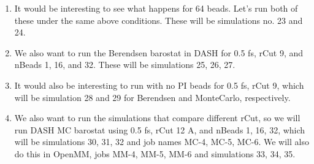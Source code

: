 \documentclass[12pt,reqno]{amsart}
\numberwithin{equation}{section}
\begin{document}
\begin{enumerate}
\item It would be interesting to see what happens for 64 beads.  Let's run both of these under the same above conditions.  These will be simulations no. 23 and 24.  
\item We also want to run the Berendsen barostat in DASH for 0.5 fs, rCut 9, and nBeads 1, 16, and 32.  These will be simulations 25, 26, 27.  
\item It would also be interesting to run with no PI beads for 0.5 fs, rCut 9, which will be simulation 28 and 29 for Berendsen and MonteCarlo, respectively.
\item We also want to run the simulations that compare different rCut, so we will run DASH MC barostat using 0.5 fs, rCut 12 A, and nBeads 1, 16, 32, which will be simulations 30, 31, 32 and job names MC-4, MC-5, MC-6.  We will also do this in OpenMM, jobs MM-4, MM-5, MM-6 and simulations 33, 34, 35.  
\end{enumerate}
\end{document}
